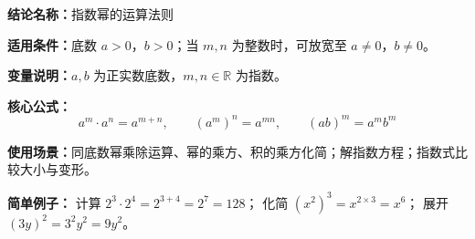 \textbf{结论名称：}指数幂的运算法则

\textbf{适用条件：}底数 $a>0$，$b>0$；当 $m,n$ 为整数时，可放宽至 $a\neq 0$，$b\neq 0$。

\textbf{变量说明：}$a,b$ 为正实数底数，$m,n\in\mathbb{R}$ 为指数。

\textbf{核心公式：}
\[
\boxed{a^m \cdot a^n = a^{m+n}},\qquad 
\boxed{(a^m)^n = a^{mn}},\qquad 
\boxed{(ab)^m = a^m b^m}
\]

\textbf{使用场景：}同底数幂乘除运算、幂的乘方、积的乘方化简；解指数方程；指数式比较大小与变形。

\textbf{简单例子：}
计算 $2^3 \cdot 2^4 = 2^{3+4}=2^7=128$；
化简 $(x^2)^3 = x^{2\times3}=x^6$；
展开 $(3y)^2 = 3^2y^2=9y^2$。